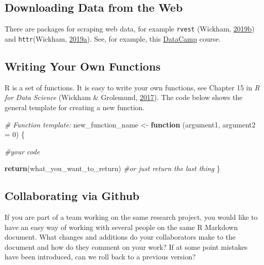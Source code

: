 \documentclass[doc,floatsintext]{apa6}
\newenvironment{Shaded}{\begin{snugshade}}{\end{snugshade}}
\newcommand{\KeywordTok}[1]{\textcolor[rgb]{0.13,0.29,0.53}{\textbf{#1}}}
\newcommand{\DataTypeTok}[1]{\textcolor[rgb]{0.13,0.29,0.53}{#1}}
\newcommand{\DecValTok}[1]{\textcolor[rgb]{0.00,0.00,0.81}{#1}}
\newcommand{\StringTok}[1]{\textcolor[rgb]{0.31,0.60,0.02}{#1}}
\newcommand{\CommentTok}[1]{\textcolor[rgb]{0.56,0.35,0.01}{\textit{#1}}}
\newcommand{\ControlFlowTok}[1]{\textcolor[rgb]{0.13,0.29,0.53}{\textbf{#1}}}
\newcommand{\NormalTok}[1]{#1}
\begin{document}
\subsection{Downloading Data from the
Web}\label{downloading-data-from-the-web}

There are packages for scraping web data, for example \texttt{rvest}
(Wickham,
\protect\hyperlink{ref-R-rvest}{2019}\protect\hyperlink{ref-R-rvest}{b})
and \texttt{httr}(Wickham,
\protect\hyperlink{ref-R-httr}{2019}\protect\hyperlink{ref-R-httr}{a}).
See, for example, this
\href{https://www.datacamp.com/courses/working-with-web-data-in-r}{DataCamp}
course.

\subsection{Writing Your Own
Functions}\label{writing-your-own-functions}

R is a set of functions. It is easy to write your own functions, see
Chapter 15 in \emph{R for Data Science} (Wickham \& Grolemund,
\protect\hyperlink{ref-WickhamDataScienceImport2017}{2017}). The code
below shows the general template for creating a new function.

\begin{Shaded}
\begin{Highlighting}[]
\CommentTok{# Function template:}
\NormalTok{new_function_name <-}\StringTok{ }\ControlFlowTok{function}\NormalTok{ (argument1, }\DataTypeTok{argument2 =} \DecValTok{0}\NormalTok{) \{}
  
  \CommentTok{#your code}
  
  \KeywordTok{return}\NormalTok{(what_you_want_to_return) }
  \CommentTok{#or just return the last thing}
\NormalTok{\}}
\end{Highlighting}
\end{Shaded}

\subsection{Collaborating via Github}\label{collaborating-via-github}

If you are part of a team working on the same research project, you
would like to have an easy way of working with several people on the
same R Markdown document. What changes and additions do your
collaborators make to the document and how do they comment on your work?
If at some point mistakes have been introduced, can we roll back to a
previous version?
\end{document}
